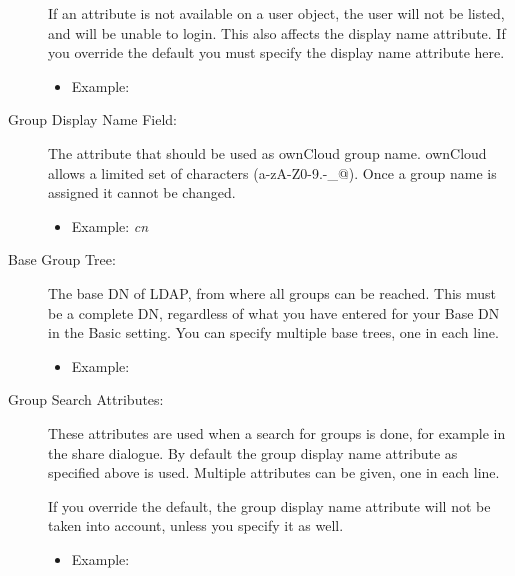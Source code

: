 \documentclass[letterpaper,10pt,english]{sphinxmanual}
\begin{document}
\begin{description}
If an attribute is not available on a user object, the user will not be
listed, and will be unable to login. This also affects the display name
attribute. If you override the default you must specify the display name
attribute here.
\begin{itemize}
\item {} 
Example:


\end{itemize}

\item[{Group Display Name Field:}] \leavevmode
The attribute that should be used as ownCloud group name. ownCloud allows a
limited set of characters (a-zA-Z0-9.-\_@). Once a group name is assigned it
cannot be changed.
\begin{itemize}
\item {} 
Example: \emph{cn}

\end{itemize}

\item[{Base Group Tree:}] \leavevmode
The base DN of LDAP, from where all groups can be reached. This must be a
complete DN, regardless of what you have entered for your Base DN in the
Basic setting. You can specify multiple base trees, one in each line.
\begin{itemize}
\item {} 
Example:


\end{itemize}

\item[{Group Search Attributes:}] \leavevmode
These attributes are used when a search for groups is done, for example in
the share dialogue. By default the group display name attribute as specified
above is used. Multiple attributes can be given, one in each line.

If you override the default, the group display name attribute will not be
taken into account, unless you specify it as well.
\begin{itemize}
\item {} 
Example:


\end{itemize}
\end{description}
\end{document}
